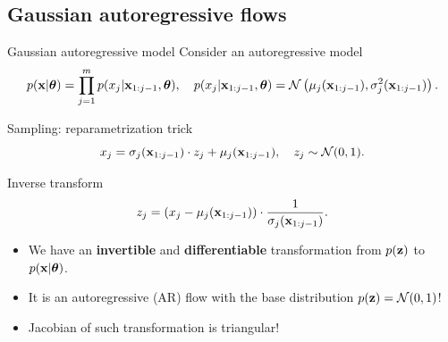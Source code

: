 \subsection{Gaussian autoregressive flows}
\begin{frame}{Gaussian autoregressive model}
	Consider an autoregressive model
	\vspace{-0.3cm}
	{\small
		\[
		p(\mathbf{x} | \boldsymbol{\theta}) = \prod_{j=1}^m p(x_j | \mathbf{x}_{1:j - 1}, \boldsymbol{\theta}), \quad
		p(x_j | \mathbf{x}_{1:j - 1}, \boldsymbol{\theta}) = \mathcal{N} \left(\mu_j(\mathbf{x}_{1:j-1}), \sigma^2_j (\mathbf{x}_{1:j-1})\right).
		\]
	}
	\vspace{-0.5cm}
	\begin{block}{Sampling: reparametrization trick}
		\vspace{-0.3cm}
		\[
		x_j = \sigma_j (\mathbf{x}_{1:j-1}) \cdot z_j + \mu_j(\mathbf{x}_{1:j-1}), \quad z_j \sim \mathcal{N}(0, 1).
		\]
		\vspace{-0.7cm}
	\end{block}
	\begin{block}{Inverse transform}
		\vspace{-0.3cm}
		\[
		z_j = \left(x_j - \mu_j(\mathbf{x}_{1:j-1}) \right) \cdot \frac{1}{\sigma_j (\mathbf{x}_{1:j-1}) }.
		\]
		\vspace{-0.4cm}
	\end{block}
	\begin{itemize}
		\item We have an \textbf{invertible} and \textbf{differentiable} transformation from $p(\mathbf{z})$ to $p(\mathbf{x} | \boldsymbol{\theta})$.
		\item It is an autoregressive (AR) flow with the base distribution $p(\mathbf{z}) = \mathcal{N}(0, 1)$!
		\item Jacobian of such transformation is triangular!
	\end{itemize}
\end{frame}
